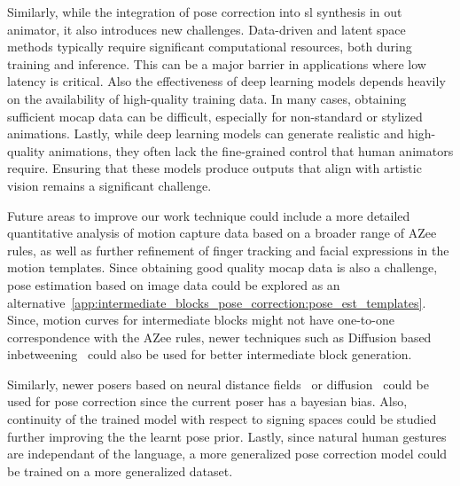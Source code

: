 \documentclass[../../main.tex]{subfiles}
\begin{document}
Similarly, while the integration of pose correction into \gls{sl} synthesis in out animator, it also introduces new challenges. Data-driven and latent space methods typically require significant computational resources, both during training and inference. This can be a major barrier in applications where low latency is critical. Also the effectiveness of deep learning models depends heavily on the availability of high-quality training data. In many cases, obtaining sufficient \gls{mocap} data can be difficult, especially for non-standard or stylized animations. Lastly, while deep learning models can generate realistic and high-quality animations, they often lack the fine-grained control that human animators require. Ensuring that these models produce outputs that align with artistic vision remains a significant challenge.

Future areas to improve our work technique could include a more detailed quantitative analysis of motion capture data based on a broader range of AZee rules, as well as further refinement of finger tracking and facial expressions in the motion templates. Since obtaining good quality \gls{mocap} data is also a challenge, pose estimation based on image data could be explored as an alternative~\ref{app:intermediate_blocks_pose_correction:pose_est_templates}. Since, motion curves for intermediate blocks might not have one-to-one correspondence with the AZee rules, newer techniques such as Diffusion based inbetweening~\cite{cohan2024flexible} could also be used for better intermediate block generation. 

Similarly, newer posers based on neural distance fields~\cite{tiwari2022pose} or diffusion~\cite{lu2023dposer} could be used for pose correction since the current poser has a bayesian bias. Also, continuity of the trained model with respect to signing spaces could be studied further improving the the learnt pose prior. Lastly, since natural human gestures are independant of the language, a more generalized pose correction model could be trained on a more generalized dataset.
\end{document}
